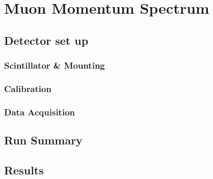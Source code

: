 \section{Muon Momentum Spectrum} %
\label{sec:muon_momentum_spectrum}
\subsection{Detector set up} %
\label{sub:mom_detector_set_up}
\subsubsection{Scintillator & Mounting} %
\label{ssub:mom_scintillator_mounting}

\subsubsection{Calibration} %
\label{ssub:mom_calibration}

\subsubsection{Data Acquisition} %
\label{ssub:mom_data_acquisition}

\subsection{Run Summary} %
\label{sub:mom_run_summary}

\subsection{Results} %
\label{sub:mom_results}

